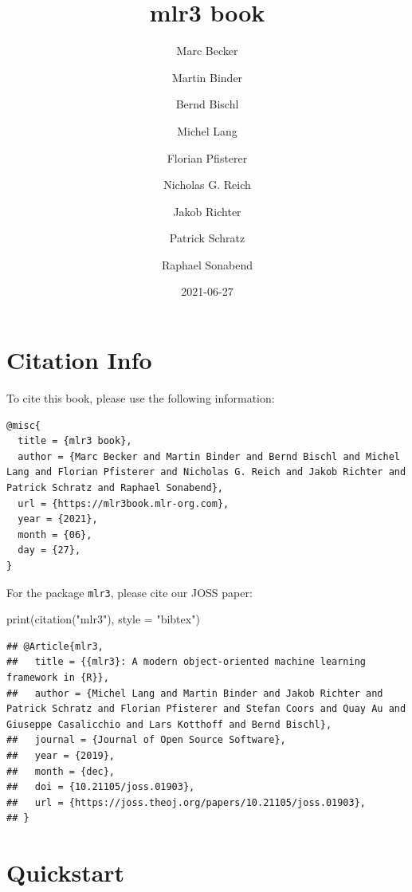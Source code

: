 \documentclass[
]{scrbook}
\title{mlr3 book}
\author{Marc Becker \and Martin Binder \and Bernd Bischl \and Michel Lang \and Florian Pfisterer \and Nicholas G. Reich \and Jakob Richter \and Patrick Schratz \and Raphael Sonabend}
\date{2021-06-27}
\newenvironment{Shaded}{\begin{snugshade}}{\end{snugshade}}
\newcommand{\AttributeTok}[1]{\textcolor[rgb]{0.77,0.63,0.00}{#1}}
\newcommand{\FunctionTok}[1]{\textcolor[rgb]{0.00,0.00,0.00}{#1}}
\newcommand{\NormalTok}[1]{#1}
\newcommand{\StringTok}[1]{\textcolor[rgb]{0.31,0.60,0.02}{#1}}
\renewenvironment{Shaded} {\begin{snugshade}\small} {\end{snugshade}}
\begin{document}
\maketitle

{
\hypersetup{linkcolor=}
\setcounter{tocdepth}{1}
\tableofcontents
}
\hypertarget{citation-info}{%
\chapter*{Citation Info}\label{citation-info}}

To cite this book, please use the following information:

\begin{verbatim}
@misc{
  title = {mlr3 book},
  author = {Marc Becker and Martin Binder and Bernd Bischl and Michel Lang and Florian Pfisterer and Nicholas G. Reich and Jakob Richter and Patrick Schratz and Raphael Sonabend},
  url = {https://mlr3book.mlr-org.com},
  year = {2021},
  month = {06},
  day = {27},
}
\end{verbatim}

For the package \texttt{mlr3}, please cite our JOSS paper:

\begin{Shaded}
\begin{Highlighting}[]
\FunctionTok{print}\NormalTok{(}\FunctionTok{citation}\NormalTok{(}\StringTok{"mlr3"}\NormalTok{), }\AttributeTok{style =} \StringTok{"bibtex"}\NormalTok{)}
\end{Highlighting}
\end{Shaded}

\begin{verbatim}
## @Article{mlr3,
##   title = {{mlr3}: A modern object-oriented machine learning framework in {R}},
##   author = {Michel Lang and Martin Binder and Jakob Richter and Patrick Schratz and Florian Pfisterer and Stefan Coors and Quay Au and Giuseppe Casalicchio and Lars Kotthoff and Bernd Bischl},
##   journal = {Journal of Open Source Software},
##   year = {2019},
##   month = {dec},
##   doi = {10.21105/joss.01903},
##   url = {https://joss.theoj.org/papers/10.21105/joss.01903},
## }
\end{verbatim}

\hypertarget{quickstart}{%
\chapter*{Quickstart}\label{quickstart}}
\end{document}
